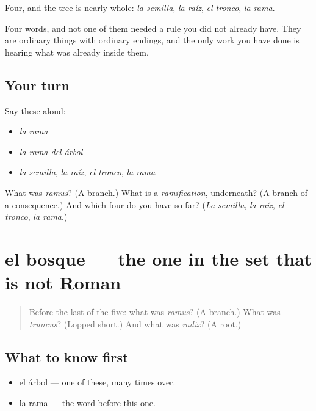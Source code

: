 \begin{grammarlens}[title={What you've built}]
Four, and the tree is nearly whole: \emph{la semilla}, \emph{la raíz}, \emph{el tronco}, \emph{la rama}.

Four words, and not one of them needed a rule you did not already have. They are ordinary things with ordinary endings, and the only work you have done is hearing what was already inside them.
\end{grammarlens}

\subsection*{Your turn}
Say these aloud:

\begin{itemize}
\raggedright
  \item \emph{la rama}
  \item \emph{la rama del árbol}
  \item \emph{la semilla}, \emph{la raíz}, \emph{el tronco}, \emph{la rama}
\end{itemize}

\begin{tcolorbox}[breakable,colback=teal!4,colframe=teal!35!black,title={Before you move on}]
What was \emph{ramus}? (A branch.) What is a \emph{ramification}, underneath? (A branch of a consequence.) And which four do you have so far? (\emph{La semilla}, \emph{la raíz}, \emph{el tronco}, \emph{la rama}.)
\end{tcolorbox}
\section[el bosque]{el bosque — the one in the set that is not Roman}

\label{lesson:ES-C291-bosque}



\begin{quote}
Before the last of the five: what was \emph{ramus}? (A branch.) What was \emph{truncus}? (Lopped short.) And what was \emph{radix}? (A root.)
\end{quote}

\subsection*{What to know first}
\begin{itemize}
\raggedright
  \item el árbol — one of these, many times over.
  \item la rama — the word before this one.
\end{itemize}


